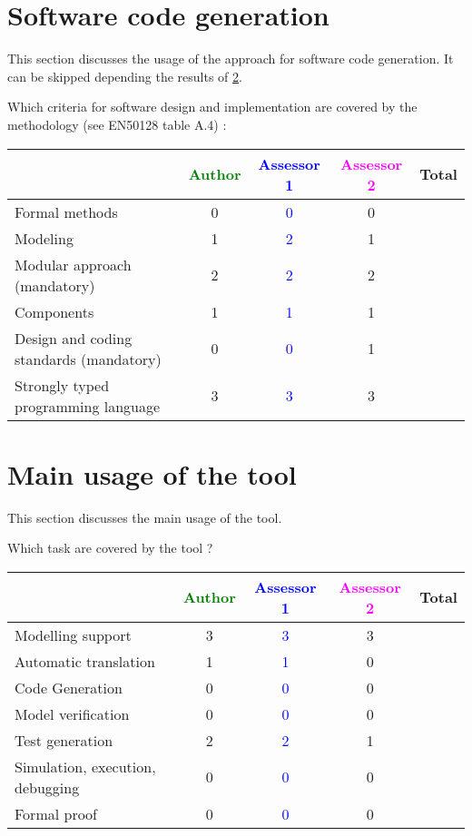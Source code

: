 \section{Software code generation}
This section discusses the usage of the approach for software code generation.
It can be skipped depending the results of \ref{main_usage}.

Which criteria for software design and implementation are covered by the methodology
(see EN50128 table A.4) :

\begin{tabular}{|l | c | c | c | c|}
\hline
& \textcolor{green}{Author} & \textcolor{blue}{Assessor 1} & \textcolor{magenta}{Assessor 2} & Total \\
\hline
Formal methods & 0 & \textcolor{blue}{0} & 0 & \\
\hline
Modeling & 1 & \textcolor{blue}{2} & 1 & \\
\hline
Modular approach (mandatory) & 2 & \textcolor{blue}{2} & 2 & \\
\hline
Components & 1 & \textcolor{blue}{1} & 1 & \\
\hline
Design and coding standards (mandatory) & 0 & \textcolor{blue}{0} & 1 & \\
\hline
Strongly typed programming language & 3 & \textcolor{blue}{3} & 3 & \\
\hline
\end{tabular}

\section{Main usage of the tool}
\label{main_usage}

This section discusses the main usage of the tool.

Which task are covered by the tool ?


\begin{tabular}{|l | c | c | c | c|}
\hline
& \textcolor{green}{Author} & \textcolor{blue}{Assessor 1} & \textcolor{magenta}{Assessor 2} & Total \\
\hline
Modelling support & 3 & \textcolor{blue}{3} & 3 & \\
\hline
Automatic translation & 1 & \textcolor{blue}{1} & 0 & \\
\hline
Code Generation & 0 & \textcolor{blue}{0} & 0 & \\
\hline
Model verification & 0 & \textcolor{blue}{0} & 0 & \\
\hline
Test generation & 2 & \textcolor{blue}{2} & 1 & \\
\hline
Simulation, execution, debugging & 0 & \textcolor{blue}{0} & 0 & \\
\hline
Formal proof & 0 & \textcolor{blue}{0} & 0 & \\
\hline
\end{tabular}

